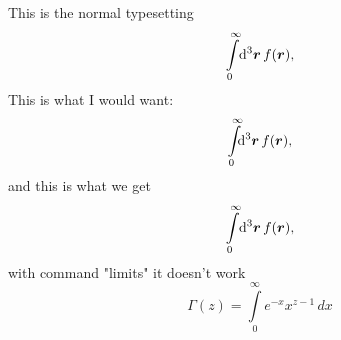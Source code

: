 \documentclass{article}
\let\oldint\int %
\begin{document}
  This is the normal typesetting
  \begin{equation}
  \oldint_0^\infty \diff[3]{\bm{r}} f(\bm{r}),
  \end{equation}
  This is what I would want:
  \begin{equation}
  \oldint_0^\infty \mspace{-4mu}\diff[3]{\bm{r}} f(\bm{r}),
  \end{equation}
  and this is what we get
  \begin{equation}
  \int_0^\infty \diff[3]{\bm{r}} f(\bm{r}),
  \end{equation}
  with command "limits" it doesn't work
  \begin{equation}
    \Gamma(z)=\int\limits_0^\infty e^{-x}x^{z-1}\,dx
  \end{equation}
\end{document}
